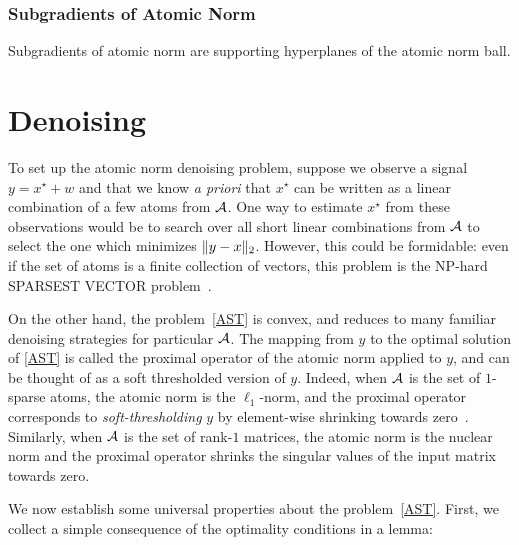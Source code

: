 \subsubsection{Subgradients of Atomic Norm}

Subgradients of atomic norm are supporting hyperplanes of the atomic norm
ball. 
\\

\section{Denoising}
\label{sec:abstract-denoising}

To set up the atomic norm denoising problem, suppose we observe a signal $y =
x^\star + w$ and that we know \emph{a priori} that $x^\star$ can be written as
a linear combination of a few atoms from $\mathcal{A}$. One way to estimate $x^\star$
from these observations would be to search over all short linear combinations
from $\mathcal{A}$ to select the one which minimizes $\lVert y- x\rVert_2$. However,
this could be formidable: even if the set of atoms is a finite collection of
vectors, this problem is the NP-hard SPARSEST VECTOR
problem~\cite{Natarajan95}.

On the other hand, the problem~\eqref{AST} is convex, and reduces to many
familiar denoising strategies for particular $\mathcal{A}$. The mapping from $y$ to the
optimal solution of \eqref{AST} is called the proximal operator of the atomic
norm applied to $y$, and can be thought of as a soft thresholded version of
$y$. Indeed, when $\mathcal{A}$ is the set of $1$-sparse atoms, the atomic norm is the
$\ell_1$-norm, and the proximal operator corresponds to
\emph{soft-thresholding} $y$ by element-wise shrinking towards
zero~\cite{donoho1995noising}. Similarly, when $\mathcal{A}$ is the set of rank-$1$
matrices, the atomic norm is the nuclear norm and the proximal operator
shrinks the singular values of the input matrix towards zero.

We now establish some universal properties about the problem~\eqref{AST}.
First, we collect a simple consequence of the optimality conditions in a lemma:

